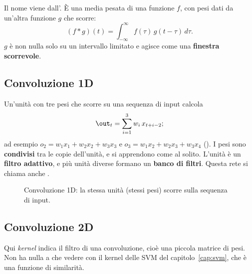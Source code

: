 Il nome viene dall'. È una media pesata di una funzione $f$, con pesi dati da
un'altra funzione $g$ che scorre:
\[
(f*g)(t) = \int_{-\infty}^{\infty}f(\tau)\,g(t-\tau)\,d\tau .
\]
$g$ è non nulla solo su un intervallo limitato e agisce come una \textbf{finestra scorrevole}.

\subsection{Convoluzione 1D}
\label{sec:conv1d}

Un'unità con tre pesi che scorre su una sequenza di input calcola
\[
\out_t = \sum_{i=1}^{3}w_i\,x_{t+i-2};
\]
ad esempio $o_2 = w_1x_1+w_2x_2+w_3x_3$ e $o_3 = w_1x_2+w_2x_3+w_3x_4$ (). I pesi sono
\textbf{condivisi} tra le copie dell'unità, e si apprendono come al solito. L'unità è un \textbf{filtro
adattivo}, e più unità diverse formano un \textbf{banco di filtri}. Questa rete si chiama anche .

\begin{figure}[ht]
\centering
{}
\caption{Convoluzione 1D: la stessa unità (stessi pesi) scorre sulla sequenza di input.}
\label{fig:conv1d}
\end{figure}

\subsection{Convoluzione 2D}

\begin{attenzione}
Qui \emph{kernel} indica il filtro di una convoluzione, cioè una piccola matrice di pesi. Non ha nulla a che vedere
con il kernel delle SVM del capitolo~\ref{cap:svm}, che è una funzione di similarità.
\end{attenzione}

